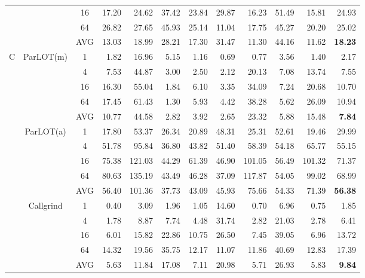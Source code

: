 \begin{table*}[]
\begin{center}
\begin{tabular}{|c|c|c|rrrrrrrr|r|}
 & & 16                             & 17.20 &  24.62 & 37.42 & 23.84 & 29.87 &  16.23 & 51.49 &  15.81 & 24.93  \\
 & & 64                             & 26.82 &  27.65 & 45.93 & 25.14 & 11.04 &  17.75 & 45.27 &  20.20 & 25.02  \\ \cline{3-12} 
 & & AVG                            & 13.03 &  18.99 & 28.21 & 17.30 & 31.47 &  11.30 & 44.16 &  11.62 & \textbf{18.23}  \\ \hline
 \multirow{15}{*}{C} & \multirow{5}{*}{ParLOT(m)} & 1  &  1.82 &  16.96 &  5.15 &  1.16 &  0.69 &   0.77 &  3.56 &   1.40 &  2.17  \\
 & & 4                                                 &  7.53 &  44.87 &  3.00 &  2.50 &  2.12 &  20.13 &  7.08 &  13.74 &  7.55  \\
 & & 16                                                & 16.30 &  55.04 &  1.84 &  6.10 &  3.35 &  34.09 &  7.24 &  20.68 & 10.70  \\
 & & 64                                                & 17.45 &  61.43 &  1.30 &  5.93 &  4.42 &  38.28 &  5.62 &  26.09 & 10.94  \\ \cline{3-12} 
 & & AVG                                               & 10.77 &  44.58 &  2.82 &  3.92 &  2.65 &  23.32 &  5.88 &  15.48 &  \textbf{7.84}  \\ \cline{2-12} 
 & \multirow{5}{*}{ParLOT(a)} & 1 & 17.80 &  53.37 & 26.34 & 20.89 & 48.31 &  25.31 & 52.61 &  19.46 & 29.99 \\
 & & 4                            & 51.78 &  95.84 & 36.80 & 43.82 & 51.40 &  58.39 & 54.18 &  65.77 & 55.15 \\
 & & 16                           & 75.38 & 121.03 & 44.29 & 61.39 & 46.90 & 101.05 & 56.49 & 101.32 & 71.37 \\
 & & 64                           & 80.63 & 135.19 & 43.49 & 46.28 & 37.09 & 117.87 & 54.05 &  99.02 & 68.99 \\ \cline{3-12}
 & & AVG                          & 56.40 & 101.36 & 37.73 & 43.09 & 45.93 &  75.66 & 54.33 &  71.39 & \textbf{56.38}  \\ \cline{2-12} 
 & \multirow{5}{*}{Callgrind} & 1 &  0.40 &   3.09 &  1.96 &  1.05 & 14.60 &   0.70 &  6.96 &   0.75 &  1.85  \\
 & & 4                            &  1.78 &   8.87 &  7.74 &  4.48 & 31.74 &   2.82 & 21.03 &   2.78 &  6.41  \\
 & & 16                           &  6.01 &  15.82 & 22.86 & 10.75 & 26.50 &   7.45 & 39.05 &   6.96 & 13.72  \\
 & & 64                           & 14.32 &  19.56 & 35.75 & 12.17 & 11.07 &  11.86 & 40.69 &  12.83 & 17.39  \\ \cline{3-12}
 & & AVG                          &  5.63 &  11.84 & 17.08 &  7.11 & 20.98 &   5.71 & 26.93 &   5.83 &  \textbf{9.84}  \\ \hline
\end{tabular}
\end{center}
\end{table*}

\fi
